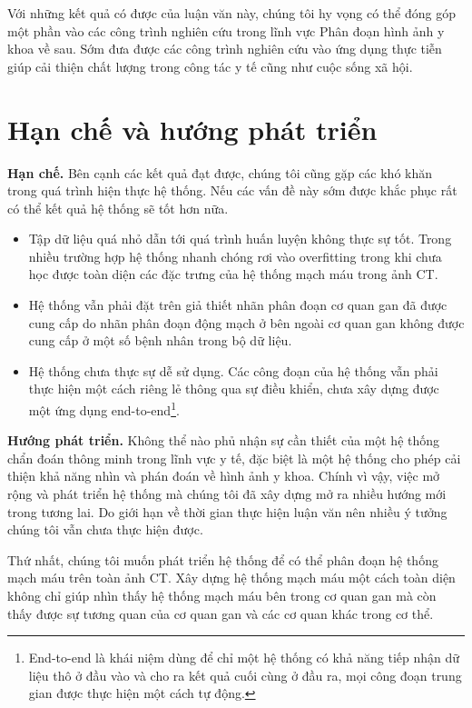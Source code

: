 	 Với những kết quả có được của luận văn này, chúng tôi hy vọng có thể đóng góp một phần vào các công trình nghiên cứu trong lĩnh vực Phân đoạn hình ảnh y khoa về sau. Sớm đưa được các công trình nghiên cứu vào ứng dụng thực tiễn giúp cải thiện chất lượng trong công tác y tế cũng như cuộc sống xã hội.

\newpage
\section{Hạn chế và hướng phát triển}
\label{sec:han_che_va_huong_phat_trien}
	\textbf{Hạn chế.\hspace{5mm}} Bên cạnh các kết quả đạt được, chúng tôi cũng gặp các khó khăn trong quá trình hiện thực hệ thống. Nếu các vấn đề này sớm được khắc phục rất có thể kết quả hệ thống sẽ tốt hơn nữa.
	\begin{itemize}
		\item Tập dữ liệu quá nhỏ dẫn tới quá trình huấn luyện không thực sự tốt. Trong nhiều trường hợp hệ thống nhanh chóng rơi vào overfitting trong khi chưa học được toàn diện các đặc trưng của hệ thống mạch máu trong ảnh CT.
		\item Hệ thống vẫn phải đặt trên giả thiết nhãn phân đoạn cơ quan gan đã được cung cấp do nhãn phân đoạn động mạch ở bên ngoài cơ quan gan không được cung cấp ở một số bệnh nhân trong bộ dữ liệu.
		\item Hệ thống chưa thực sự dễ sử dụng. Các công đoạn của hệ thống vẫn phải thực hiện một cách riêng lẻ thông qua sự điều khiển, chưa xây dựng được một ứng dụng end-to-end\footnote{End-to-end là khái niệm dùng để chỉ một hệ thống có khả năng tiếp nhận dữ liệu thô ở đầu vào và cho ra kết quả cuối cùng ở đầu ra, mọi công đoạn trung gian được thực hiện một cách tự động.}.
	\end{itemize}

	\textbf{Hướng phát triển.\hspace{5mm}} Không thể nào phủ nhận sự cần thiết của một hệ thống chẩn đoán thông minh trong lĩnh vực y tế, đặc biệt là một hệ thống cho phép cải thiện khả năng nhìn và phán đoán về hình ảnh y khoa. Chính vì vậy, việc mở rộng và phát triển hệ thống mà chúng tôi đã xây dựng mở ra nhiều hướng mới trong tương lai. Do giới hạn về thời gian thực hiện luận văn nên nhiều ý tưởng chúng tôi vẫn chưa thực hiện được.
	
	Thứ nhất, chúng tôi muốn phát triển hệ thống để có thể phân đoạn hệ thống mạch máu trên toàn ảnh CT. Xây dựng hệ thống mạch máu một cách toàn diện không chỉ giúp nhìn thấy hệ thống mạch máu bên trong cơ quan gan mà còn thấy được sự tương quan của cơ quan gan và các cơ quan khác trong cơ thể.
	
